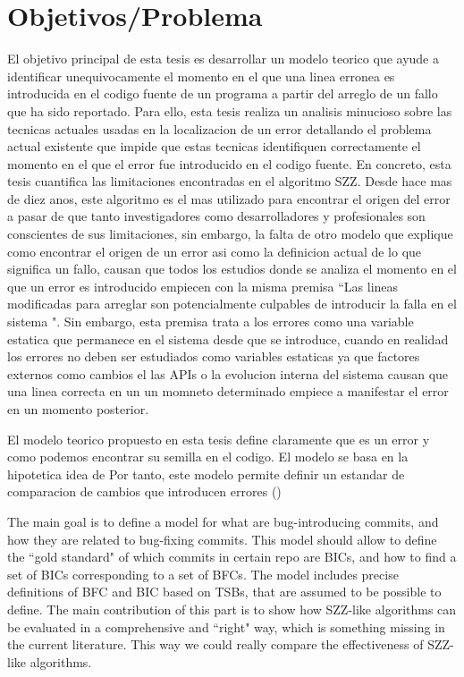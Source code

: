 \documentclass[a4paper, 12pt]{book}
\begin{document}
\section{Objetivos/Problema}
El objetivo principal de esta tesis es desarrollar un modelo teorico que ayude a identificar unequivocamente el momento en el que una linea erronea es introducida en el codigo fuente de un programa a partir del arreglo de un fallo que ha sido reportado. Para ello, esta tesis realiza un analisis minucioso sobre las tecnicas actuales usadas en la localizacion de un error detallando el problema actual existente que impide que estas tecnicas identifiquen correctamente el momento en el que el error fue introducido en el codigo fuente. En concreto, esta tesis cuantifica las limitaciones encontradas en el algoritmo SZZ. Desde hace mas de diez anos, este algoritmo es el mas utilizado para encontrar el origen del error a pasar de que tanto investigadores como desarrolladores y profesionales son conscientes de sus limitaciones, sin embargo, la falta de otro modelo que explique como encontrar el origen de un error asi como la definicion actual de lo que significa un fallo, causan que todos los estudios donde se analiza el momento en el que un error es introducido empiecen con la misma premisa ``Las lineas modificadas para arreglar son potencialmente culpables de introducir la falla en el sistema ". Sin embargo, esta premisa trata a los errores como una variable estatica que permanece en el sistema desde que se introduce, cuando en realidad los errores no deben ser estudiados como variables estaticas ya que factores externos como cambios el las APIs o la evolucion interna del sistema causan que una linea correcta en un un momneto determinado empiece a manifestar el error en un momento posterior.   

El modelo teorico propuesto en esta tesis define claramente que es un error y como podemos encontrar su semilla en el codigo. El modelo se basa en la hipotetica idea de 
Por tanto, este modelo permite definir un estandar de comparacion de cambios que introducen errores (\BIC)

The main goal is to define a model for what are bug-introducing commits, and how they are related to bug-fixing commits. This model should allow to define the ``gold standard" of which commits in certain repo are BICs, and how to find a set of BICs corresponding to a set of BFCs. The model includes precise definitions of BFC and BIC based on TSBs, that are assumed to be possible to define. The main contribution of this part is to show how SZZ-like algorithms can be evaluated in a comprehensive and ``right" way, which is something missing in the current literature. This way we could really compare the effectiveness of SZZ-like algorithms.
\end{document}
